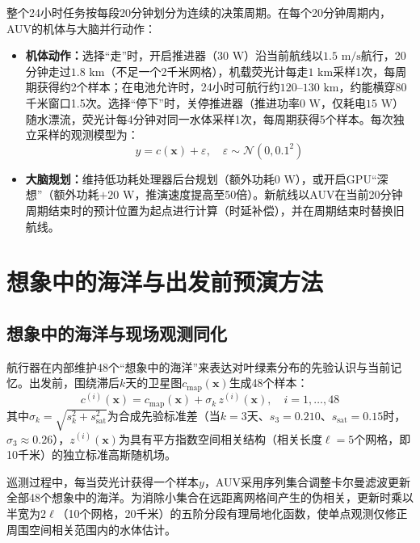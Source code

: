 整个24小时任务按每段20分钟划分为连续的决策周期。在每个20分钟周期内，AUV的机体与大脑并行动作\cite{xiao2020thinking, elboher2023formal}：
\begin{itemize}
  \item \textbf{机体动作：}选择“走”时，开启推进器（$30\text{ W}$）沿当前航线以$1.5\text{ m/s}$航行，20分钟走过$1.8\text{ km}$（不足一个2千米网格），机载荧光计每走$1\text{ km}$采样1次，每周期获得约2个样本；在电池允许时，24小时可航行约$120\text{--}130\text{ km}$，约能横穿80千米窗口1.5次。选择“停下”时，关停推进器（推进功率$0\text{ W}$，仅耗电$15\text{ W}$）随水漂流，荧光计每4分钟对同一水体采样1次，每周期获得5个样本。每次独立采样的观测模型为：
  \begin{equation}
    y = c(\mathbf{x}) + \varepsilon, \quad \varepsilon \sim \mathcal{N}(0, 0.1^2)
    \label{eq:obs}
  \end{equation}
  \item \textbf{大脑规划：}维持低功耗处理器后台规划（额外功耗$0\text{ W}$），或开启GPU“深想”（额外功耗$+20\text{ W}$，推演速度提高至50倍）。新航线以AUV在当前20分钟周期结束时的预计位置为起点进行计算（时延补偿），并在周期结束时替换旧航线。
\end{itemize}

\section{想象中的海洋与出发前预演方法}

\subsection{想象中的海洋与现场观测同化}

航行器在内部维护48个“想象中的海洋”来表达对叶绿素分布的先验认识与当前记忆。出发前，围绕滞后$k$天的卫星图$c_{\text{map}}(\mathbf{x})$生成48个样本：
\begin{equation}
  c^{(i)}(\mathbf{x}) = c_{\text{map}}(\mathbf{x}) + \sigma_k\, z^{(i)}(\mathbf{x}), \quad i = 1, \dots, 48
  \label{eq:prior}
\end{equation}
其中$\sigma_k = \sqrt{s_k^2 + s_{\text{sat}}^2}$为合成先验标准差（当$k=3$天、$s_3=0.210$、$s_{\text{sat}}=0.15$时，$\sigma_3 \approx 0.26$），$z^{(i)}(\mathbf{x})$为具有平方指数空间相关结构（相关长度$\ell = 5$个网格，即10千米）的独立标准高斯随机场。

巡测过程中，每当荧光计获得一个样本$y$，AUV采用序列集合调整卡尔曼滤波\cite{anderson2001eakf}更新全部48个想象中的海洋。为消除小集合在远距离网格间产生的伪相关，更新时乘以半宽为$2\ell$（10个网格，20千米）的五阶分段有理局地化函数\cite{gaspari1999correlation}，使单点观测仅修正周围空间相关范围内的水体估计。

